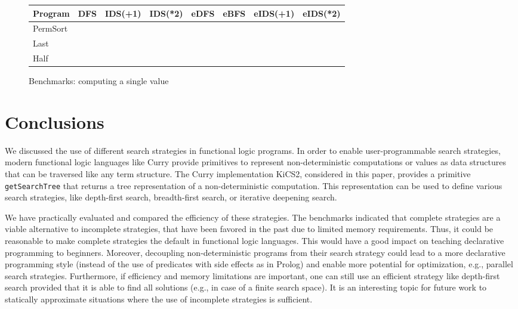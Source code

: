 \documentclass[english]{lni}
\newcommand{\code}[1]{\texttt{\small{}#1}}
\begin{document}
\begin{figure}[ht]
\centering
\begin{tabular}{|@{~~}l@{~~}|*{7}{@{~~}r@{~~}|}}
\hline
Program  &   DFS  & IDS(+1)& IDS(*2)&  eDFS  &  eBFS  &eIDS(+1)&eIDS(*2)\\
\hline
PermSort &        &        &        &        &        &        &        \\
Last     &        &        &        &        &        &        &        \\
Half     &        &        &        &        &        &        &        \\
\hline
\end{tabular}
\caption{Benchmarks: computing a single value}
\label{fig:bench-first-solution}
\end{figure}


\section{Conclusions}
\label{sec:conclusions}

We discussed the use of different search strategies
in functional logic programs.
In order to enable user-programmable search strategies,
modern functional logic languages like Curry
provide primitives to represent non-deterministic computations
or values as data structures that can be traversed like
any term structure.
The Curry implementation KiCS2, considered in this paper,
provides a primitive \code{getSearchTree}
that returns a tree representation of a non-deterministic computation.
This representation can be used to define various search strategies,
like depth-first search, breadth-first search, or iterative deepening
search.

We have practically evaluated and compared
the efficiency of these strategies.
The benchmarks indicated that complete strategies
are a viable alternative to incomplete strategies,
that have been favored in the past due to limited memory requirements.
Thus, it could be reasonable to make
complete strategies the default in functional logic languages.
This would have a good impact on teaching declarative programming
to beginners.
Moreover, decoupling non-deterministic programs
from their search strategy could lead to a more declarative
programming style (instead of the use of predicates with
side effects as in Prolog) and enable more potential for
optimization, e.g., parallel search strategies.
Furthermore, if efficiency and memory limitations are important,
one can still use an efficient strategy like depth-first search
provided that it is able to find all solutions
(e.g., in case of a finite search space).
It is an interesting topic for future work
to statically approximate situations where
the use of incomplete strategies is sufficient.


%

\end{document}
